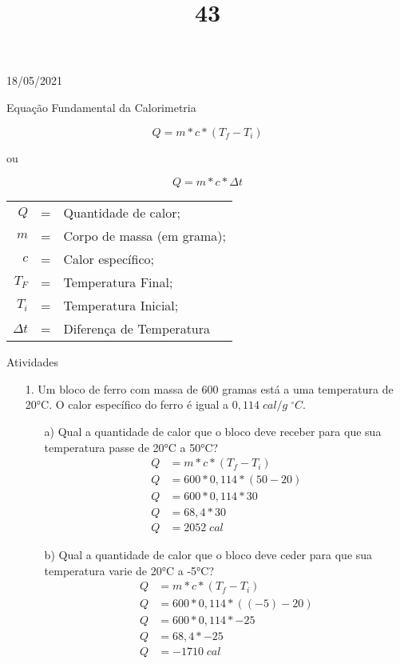 \documentclass{SchoolBook}
\begin{document}
    \begin{day}{18/05/2021}
        \title{4}{Equação Fundamental da Calorimetria}
        
        $$ Q = m * c * (T_f - T_i) $$
        \begin{center}
            ou
        \end{center}
        $$ Q = m * c * \Delta t $$
        
        \vspace{6pt}
        \begin{tabular}{ r c l }
                   $ Q $ &=& Quantidade de calor;       \\
                   $ m $ &=& Corpo de massa (em grama); \\
                   $ c $ &=& Calor específico;          \\
                 $ T_F $ &=& Temperatura Final;         \\
                 $ T_i $ &=& Temperatura Inicial;       \\
            $ \Delta t $ &=& Diferença de Temperatura 
        \end{tabular}
        \vspace{6pt}
        
        \title{3}{Atividades}
        
        \begin{enumerate}
            \item[1.] Um bloco de ferro com massa de 600 gramas está a uma temperatura de 20°C. O calor específico do ferro é igual a $ 0,114\;cal/g\;^\circ C $.
            \begin{enumerate}
                \item[a)] Qual a quantidade de calor que o bloco deve receber para que sua temperatura passe de 20°C a 50°C?
                \begin{align*}
                    Q &= m * c * (T_f - T_i)     \\
                    Q &= 600 * 0,114 * (50 - 20) \\
                    Q &= 600 * 0,114 * 30        \\
                    Q &= 68,4 * 30               \\
                    Q &= 2052\;cal
                \end{align*}
                
                \item[b)] Qual a quantidade de calor que o bloco deve ceder para que sua temperatura varie de 20°C a -5°C?
                \begin{align*}
                    Q &= m * c * (T_f - T_i)       \\
                    Q &= 600 * 0,114 * ((-5) - 20) \\
                    Q &= 600 * 0,114 * -25         \\
                    Q &= 68,4 * -25                \\
                    Q &= -1710\;cal
                \end{align*}
                

\end{enumerate}
\end{enumerate}
\end{day}
\end{document}

